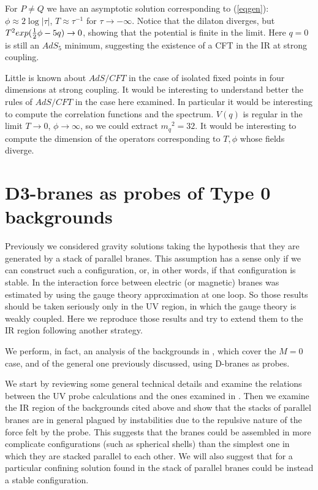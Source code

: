 \documentclass[a4paper,12pt]{article}
\def\half{{1 \over 2}}
\begin{document}
For $P\neq Q$ we have an asymptotic solution corresponding to (\ref{eqgen}): 
$\phi \approx 2 \log |\tau|$, $T\approx \tau^{-1}$ for $\tau\rightarrow -\infty$. 
Notice that the dilaton diverges, but $ T^2 exp(\half\phi -5q)\rightarrow 0$, showing that the potential is finite in the limit. Here $q=0$ is still an $AdS_5$ minimum, suggesting the existence of a CFT in the IR at strong coupling.

Little is known about $AdS/CFT$ in the case of isolated fixed points in four dimensions
at strong coupling. It would be interesting to understand better the rules of $AdS/CFT$
in the case here examined. In particular it would be interesting to compute the correlation functions and the spectrum. $V(q)$ is regular in the limit $T\rightarrow 0$, 
$\phi\rightarrow\infty$, so we could extract ${m_q}^2 = 32$. It would be interesting to compute the dimension of the operators corresponding to $T, \phi$ whose fields diverge.







\section{D3-branes as probes of Type 0 backgrounds}

Previously we considered gravity solutions taking the hypothesis that they
are generated by a stack of parallel branes. This assumption has a sense only 
if we can construct such a configuration, or, in other words, if that configuration is stable. In \cite{tz} the interaction force between electric
(or magnetic) branes was estimated by using the gauge theory approximation at one
loop. So those results should be taken seriously only in the UV region,
 in which the gauge theory is weakly coupled. Here we reproduce
those results and try to extend them to the IR region following another strategy.

We perform, in fact, an analysis of the backgrounds in \cite{kt0}, \cite{minahan} which cover the $M=0$ case, and of the general one previously discussed, using D-branes as probes.

We start by reviewing  some general technical details and examine the relations between the UV probe calculations and the ones examined in \cite{tz}. Then we examine the IR region of the backgrounds cited above and show that the stacks of parallel branes are in general plagued by instabilities due to the repulsive nature of the force felt by the probe. This suggests that the branes could be assembled in more complicate configurations (such as spherical shells)
than the simplest one in which they are stacked parallel to each other.
We will also suggest that for a particular confining solution found in \cite{minahan} the stack of parallel branes could be instead a stable configuration.
\end{document}
